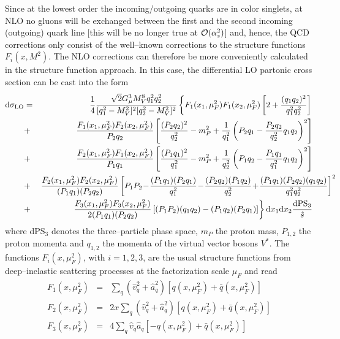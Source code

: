 Since at the lowest order the incoming/outgoing quarks are in color singlets, 
at NLO no
gluons will be exchanged between the first and the second incoming (outgoing)
quark line [this will be no longer true at ${\cal O}(\alpha_s^2)$] and, hence,
the QCD corrections only consist of the well--known corrections to the
structure functions $F_i(x,M^2)$. The NLO corrections can therefore be more
conveniently calculated in the structure function approach. In this case,  
the differential LO partonic cross section  can be cast into the 
form \cite{pp-Hqq-NLO1,HVNLO-DS,Review-Michael} 
\begin{eqnarray}
{\rm d}\sigma_{\rm LO} &=& \frac{1}{4} \frac{\sqrt{2}G_\mu^3M_V^8
q_1^2 q_2^2} {[q_1^2-M_V^2]^2 [q_2^2-M_V^2]^2} \left\{
F_1(x_1,\mu_F^2) F_1(x_2,\mu_F^2) \left[ 2+\frac{(q_1 q_2)^2}{q_1^2q_2^2} 
\right] \right. \nonumber \\
&+& \frac{F_1(x_1,\mu_F^2)F_2(x_2,\mu_F^2)}{P_2q_2} \left[\frac{(P_2q_2)^2}
{q_2^2}- m_P^2+\frac{1}{q_1^2}\left(P_2q_1-\frac{P_2q_2}{q_2^2}q_1q_2\right)^2 
\right] \nonumber \\
&+&\! \frac{F_2(x_1,\mu_F^2)F_1(x_2,\mu_F^2)}{P_1q_1}\left[\frac{(P_1q_1)^2}
{q_1^2}- m_P^2+\frac{1}{q_2^2}\left(P_1q_2-\frac{P_1q_1}{q_1^2}q_1q_2\right)^2 
\right] \nonumber \\
&+& \frac{F_2(x_1,\mu_F^2)F_2(x_2,\mu_F^2)}{(P_1q_1)(P_2q_2)}\left[P_1P_2\!-\! 
\frac{(P_1q_1)(P_2q_1)}{q_1^2}\!-\!\frac{(P_2q_2)(P_1q_2)}{q_2^2} 
\!+\! \frac{(P_1q_1)(P_2q_2)(q_1q_2)}{q_1^2q_2^2}\right]^2 \hspace*{-1cm}
\nonumber \\ 
&+&\left. \frac{F_3(x_1,\mu_F^2)F_3(x_2,\mu_F^2)}{2(P_1q_1)(P_2q_2)}\left[
(P_1P_2)(q_1q_2) - (P_1q_2)(P_2q_1) \right] \right\} {\rm d} x_1 {\rm d}x_2
\frac{{\rm dPS}_3}{\hat s}
\label{eq:vvhlo}
\end{eqnarray}
where dPS$_3$ denotes the three--particle phase space, $m_P$ the proton mass, 
$P_{1,2}$ the proton momenta and $q_{1,2}$ the momenta of the virtual vector 
bosons $V^*$. The functions $F_i(x,\mu_F^2)$, with {\small $i=1,2,3$}, are the 
usual structure functions from deep--inelastic scattering processes at the 
factorization scale $\mu_F$ and read 
\begin{eqnarray}
F_1(x,\mu_F^2) & = & \sum_q (\hat v_q^2+\hat a_q^2) [q(x,\mu_F^2) + \bar 
q(x,\mu_F^2)] \nonumber \\
F_2(x,\mu_F^2) & = & 2x \sum_q (\hat v_q^2+\hat a_q^2) [q(x,\mu_F^2) + 
\bar q(x,\mu_F^2)] \nonumber \\
F_3(x,\mu_F^2) & = & 4 \sum_q \hat v_q \hat a_q [-q(x,\mu_F^2) + 
\bar q(x,\mu_F^2)]
\label{eq:stfu}
\end{eqnarray}
